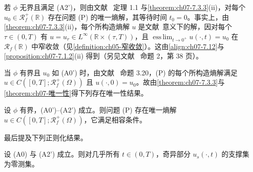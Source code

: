 \documentclass[../../main.tex]{subfiles}%
\begin{document}
\begin{remark}\label{remark:ch07-7.3.1}
若 $\phi$ 无界且满足 (A2')，则由文献~\cite{ref67} 定理 1.1 与\cref{theorem:ch07-7.3.3}(ii)，对每个 $u_0\in\mathscr{R}_f^+(\mathbb{R})$ 存在问题 (P) 的唯一熵解，其等待时间 $t_0=0$。事实上，由\cref{theorem:ch07-7.3.3}(ii)，每个所构造熵解 $u$ 是文献~\cite{ref67}意义下的解，因对每个 $\tau\in(0,T)$ 有 $u=u_r\in L^\infty(\mathbb{R}\times(\tau,T))$，且 $\operatorname*{ess\,lim}_{t\to0^+}u(\cdot,t)=u_0$ 在 $\mathscr{R}_f(\mathbb{R})$ 中窄收敛（见\cref{definition:ch05-窄收敛}）。这由\eqref{align:ch07-7.12}与\cref{proposition:ch07-7.1.2}(ii) 得到（另见文献~\cite{ref53} 命题 2，第 38 页）。

当 $\phi$ 有界且 $u_0$ 如 (A0') 时，由文献~\cite{ref17} 命题 3.20，(P) 的每个所构造熵解满足 $u\in C([0,T];\mathscr{R}_f^+(\Omega))$ 且 $u(\cdot,0)=u_0$。故由\cref{theorem:ch07-7.3.3}与\cref{theorem:ch07-唯一性}得下列存在唯一性结果。
\end{remark}

\begin{theorem}\label{theorem:ch07-存在唯一}
设 $\phi$ 有界，(A0')--(A2') 成立。则问题 (P) 存在唯一熵解 $u\in C([0,T];\mathscr{R}_f^+(\Omega))$，它满足相容条件。
\end{theorem}

最后提及下列正则化结果。

\begin{proposition}\label{proposition:ch07-7.3.5}
设 (A0) 与 (A2') 成立。则对几乎所有 $t\in(0,T)$，奇异部分 $u_s(\cdot,t)$ 的支撑集为零测集。
\end{proposition}
\end{document}
